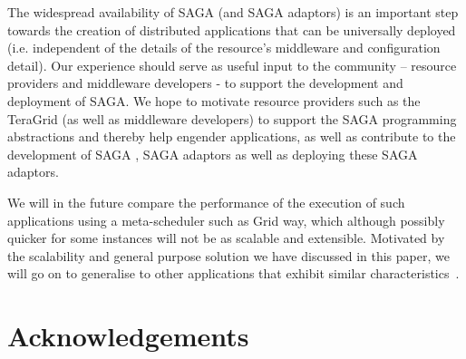 \documentclass[conference,final]{IEEEtran}
\begin{document}
The widespread availability of SAGA (and SAGA adaptors) is an
important step towards the creation of distributed applications that
can be universally deployed (i.e.  independent of the details of the
resource's middleware and configuration detail).  Our experience
should serve as useful input to the community -- resource providers
and middleware developers - to support the development and deployment
of SAGA.  We hope to motivate  resource providers such as the TeraGrid
(as well as middleware developers) to support the SAGA programming
abstractions and thereby help engender applications, as well as
contribute to the development of SAGA , SAGA adaptors as well as
deploying these SAGA adaptors.

We will in the future compare the performance of the execution of such
applications using a meta-scheduler such as Grid way, which although
possibly quicker for some instances will not be as scalable and
extensible. Motivated by the scalability and general purpose solution
we have discussed in this paper, we will go on to generalise to other
applications that exhibit similar characteristics~\cite{nature99}.







\section{Acknowledgements}
\end{document}
